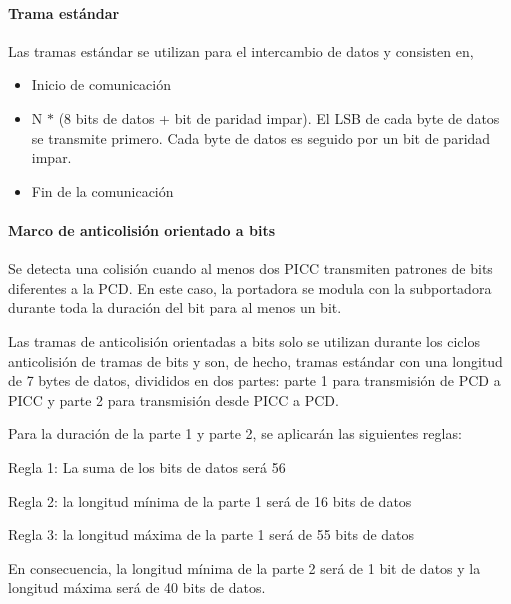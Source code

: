 \par
\paragraph{Trama estándar}
Las tramas estándar se utilizan para el intercambio de datos y consisten en,\par

\begin{itemize}
	\item Inicio de comunicación\par

	\item N $\ast$  (8 bits de datos + bit de paridad impar). El LSB de cada byte de datos se transmite primero. Cada byte de datos es seguido por un bit de paridad impar.\par

	\item Fin de la comunicación
\end{itemize}\par

\paragraph{Marco de anticolisión orientado a bits}
Se detecta una colisión cuando al menos dos PICC transmiten patrones de bits diferentes a la PCD. En este caso, la portadora se modula con la subportadora durante toda la duración del bit para al menos un bit.\par

Las tramas de anticolisión orientadas a bits solo se utilizan durante los ciclos anticolisión de tramas de bits y son, de hecho, tramas estándar con una longitud de 7 bytes de datos, divididos en dos partes: parte 1 para transmisión de PCD a PICC y parte 2 para transmisión desde PICC a PCD.\par

Para la duración de la parte 1 y parte 2, se aplicarán las siguientes reglas:\par

Regla 1: La suma de los bits de datos será 56\par

Regla 2: la longitud mínima de la parte 1 será de 16 bits de datos\par

Regla 3: la longitud máxima de la parte 1 será de 55 bits de datos\par

En consecuencia, la longitud mínima de la parte 2 será de 1 bit de datos y la longitud máxima será de 40 bits de datos.\par

